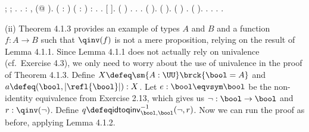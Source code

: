 \begin{coqdoccode}
\coqdocindent{1.00em}
;  ; .\coqdoceol
\coqdocnoindent
{}.\coqdoceol
\coqdocemptyline
\coqdocnoindent
{}  : \coqdockw{\ensuremath{\forall}}  ,  (@  ).\coqdoceol
\coqdocemptyline
\coqdocnoindent
{}  (   : ) ( :  \coqdocnotation{\ensuremath{\eqvsym}} ) : \coqdocnotation{(}  \coqdocnotation{)} \coqdocnotation{\ensuremath{\eqvsym}} \coqdocnotation{(}  \coqdocnotation{)}.\coqdoceol
\coqdocnoindent
{}.\coqdoceol
\coqdocindent{1.00em}
   [ ].\coqdoceol
\coqdocindent{1.00em}
 ( )  . \coqdoctac{\ensuremath{\exists}} . .\coqdoceol
\coqdocindent{2.00em}
 ( ).  ( ).\coqdoceol
\coqdocindent{1.00em}
 ( \coqdocnotation{=} )  .  (  ).  \coqdocnotation{(}\coqdocnotation{;} \coqdocnotation{)}.\coqdoceol
\coqdocindent{1.00em}
.  .\coqdoceol
\coqdocnoindent
{}.\coqdoceol
\coqdocemptyline
\end{coqdoccode}
(ii) Theorem 4.1.3 provides an example of types $A$ and $B$ and a function $f:
A \to B$ such that $\qinv(f)$ is not a mere proposition, relying on the result
of Lemma 4.1.1.  Since Lemma 4.1.1 does not actually rely on univalence
(cf.~Exercise 4.3), we only need to worry about the use of univalence in the
proof of Theorem 4.1.3.  Define $X \defeq \sm{A : \UU} \brck{\bool = A}$ and
$a \defeq (\bool, \lvert \refl{\bool} \rvert) : X$.  Let $e : \bool \eqvsym
\bool$ be the non-identity equivalence from Exercise 2.13, which gives us
$\lnot : \bool \to \bool$ and $r : \qinv(\lnot)$.  Define $q \defeq
\mathsf{idtoqinv}_{\bool, \bool}^{-1}(\lnot, r)$.  Now we can run the proof as
before, applying Lemma 4.1.2.  


